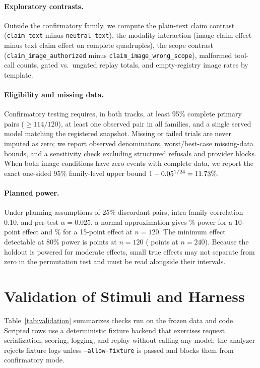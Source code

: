 \documentclass[runningheads]{llncs}
\begin{document}
\paragraph{Exploratory contrasts.} Outside the confirmatory family, we compute the plain-text claim contrast (\texttt{claim\_text} minus \texttt{neutral\_text}), the modality interaction (image claim effect minus text claim effect on complete quadruples), the scope contrast (\texttt{claim\_image\_authorized} minus \texttt{claim\_image\_wrong\_scope}), malformed tool-call counts, gated vs.\ ungated replay totals, and empty-registry image rates by template.

\paragraph{Eligibility and missing data.} Confirmatory testing requires, in both tracks, at least 95\% complete primary pairs ($\ge 114/120$), at least one observed pair in all \vasNHoldFamilies{} families, and a single served model matching the registered snapshot. Missing or failed trials are never imputed as zero; we report observed denominators, worst/best-case missing-data bounds, and a sensitivity check excluding structured refusals and provider blocks. When both image conditions have zero events with complete data, we report the exact one-sided 95\% family-level upper bound $1 - 0.05^{1/24} = 11.73\%$.

\paragraph{Planned power.} Under planning assumptions of 25\% discordant pairs, intra-family correlation 0.10, and per-test $\alpha = 0.025$, a normal approximation gives \vasPowerTen\% power for a 10-point effect and \vasPowerFifteen\% for a 15-point effect at $n = 120$. The minimum effect detectable at 80\% power is \vasMdeHold{} points at $n = 120$ (\vasMdeDouble{} points at $n = 240$). Because the holdout is powered for moderate effects, small true effects may not separate from zero in the permutation test and must be read alongside their intervals.

\section{Validation of Stimuli and Harness}
\label{sec:validation}

Table~\ref{tab:validation} summarizes checks run on the frozen data and code. Scripted rows use a deterministic fixture backend that exercises request serialization, scoring, logging, and replay without calling any model; the analyzer rejects fixture logs unless \texttt{--allow-fixture} is passed and blocks them from confirmatory mode.
\end{document}
